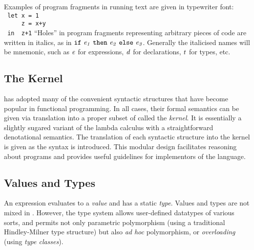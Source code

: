 Examples of \Haskell{} program fragments in running text are given
in typewriter font:
\bprog
\mbox{\tt \ let\ x\ =\ 1}\\
\mbox{\tt \ \ \ \ \ z\ =\ x+y}\\
\mbox{\tt \ in\ \ z+1}
\eprog
``Holes'' in program fragments representing arbitrary
pieces of \Haskell{} code are written in italics, as in 
\mbox{$\it \makebox{\tt if}\ e_1\ \makebox{\tt then}\ e_2\ \makebox{\tt else}\ e_3$}.  Generally the italicised names will
be mnemonic, such as \mbox{$\it e$} for expressions, \mbox{$\it d$} for
declarations, \mbox{$\it t$} for types, etc.

\subsection{The \Haskell{} Kernel}
\label{intro-kernel}

\Haskell{} has adopted many of the convenient syntactic structures
that have become popular
in functional programming.  In all cases, their formal
semantics can be given via translation into a proper subset of
\Haskell{} called the \Haskell{} {\em kernel}.  It is
essentially a slightly sugared variant of the lambda calculus with
a straightforward denotational semantics.  The translation of each
syntactic structure into the kernel is given as the syntax is
introduced.
This modular design facilitates
reasoning about \Haskell{} programs and provides useful guidelines
for implementors of the language.


\subsection{Values and Types}
\label{errors}

An expression evaluates to a {\em value} and has a
static {\em type}.  Values and types are not mixed in
\Haskell{}.
However, the type system
allows user-defined datatypes of various sorts, and permits not only
parametric polymorphism (using a
traditional Hindley-Milner type structure) but
also {\em ad hoc} polymorphism, or {\em overloading} (using
{\em type classes}).

